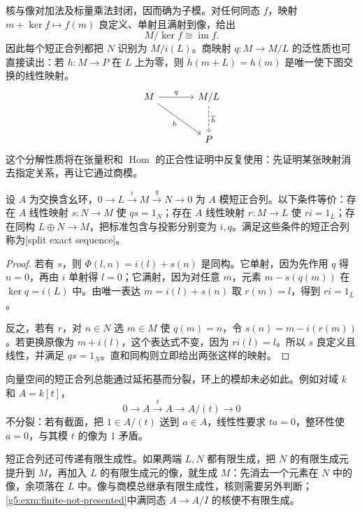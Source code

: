 核与像对加法及标量乘法封闭，因而确为子模。对任何同态 \(f\)，映射 \(m+\ker f\mapsto f(m)\) 良定义、单射且满射到像，给出
\[
	M/\ker f\cong\operatorname{im}f.
\]
因此每个短正合列都把 \(N\) 识别为 \(M/i(L)\)。商映射 \(q:M\rightarrow M/L\) 的泛性质也可直接读出：若 \(h:M\rightarrow P\) 在 \(L\) 上为零，则 \(\overline h(m+L)=h(m)\) 是唯一使下图交换的线性映射。
\[
	\begin{tikzcd}[column sep=large,row sep=large]
		M\arrow[r,"q"]\arrow[dr,"h"']&M/L\arrow[d,dashed,"\overline h"]\\
		&P
	\end{tikzcd}
\]
这个分解性质将在张量积和 \(\operatorname{Hom}\) 的正合性证明中反复使用：先证明某张映射消去指定关系，再让它通过商模。

\begin{proposition}\label{g5:prop:split-exact-modules}
	设 \(A\) 为交换含幺环，\(0\rightarrow L\xrightarrow{i}M\xrightarrow{q}N\rightarrow0\) 为 \(A\) 模短正合列。以下条件等价：存在 \(A\) 线性映射 \(s:N\rightarrow M\) 使 \(qs=1_N\)；存在 \(A\) 线性映射 \(r:M\rightarrow L\) 使 \(ri=1_L\)；存在同构 \(L\oplus N\rightarrow M\)，把标准包含与投影分别变为 \(i,q\)。满足这些条件的短正合列称为[split exact sequence]。
\end{proposition}
\begin{proof}
	若有 \(s\)，则 \(\Phi(l,n)=i(l)+s(n)\) 是同构。它单射，因为先作用 \(q\) 得 \(n=0\)，再由 \(i\) 单射得 \(l=0\)；它满射，因为对任意 \(m\)，元素 \(m-s(q(m))\) 在 \(\ker q=i(L)\) 中。由唯一表达 \(m=i(l)+s(n)\) 取 \(r(m)=l\)，得到 \(ri=1_L\)。

	反之，若有 \(r\)，对 \(n\in N\) 选 \(m\in M\) 使 \(q(m)=n\)，令 \(s(n)=m-i(r(m))\)。若更换原像为 \(m+i(l)\)，这个表达式不变，因为 \(ri(l)=l\)。所以 \(s\) 良定义且线性，并满足 \(qs=1_N\)。直和同构则立即给出两张这样的映射。
\end{proof}

向量空间的短正合列总能通过延拓基而分裂，环上的模却未必如此。例如对域 \(k\) 和 \(A=k[t]\)，
\[
	0\longrightarrow A\xrightarrow{\,t\,}A\longrightarrow A/(t)\longrightarrow0
\]
不分裂：若有截面，把 \(1\in A/(t)\) 送到 \(a\in A\)，线性性要求 \(ta=0\)，整环性使 \(a=0\)，与其模 \(t\) 的像为 \(1\) 矛盾。

\ProseParagraphBreak

短正合列还可传递有限生成性。如果两端 \(L,N\) 都有限生成，把 \(N\) 的有限生成元提升到 \(M\)，再加入 \(L\) 的有限生成元的像，就生成 \(M\)：先消去一个元素在 \(N\) 中的像，余项落在 \(L\) 中。像与商模总继承有限生成性，核则需要另外判断；\cref{g5:exm:finite-not-presented}中满同态 \(A\rightarrow A/I\) 的核便不有限生成。

